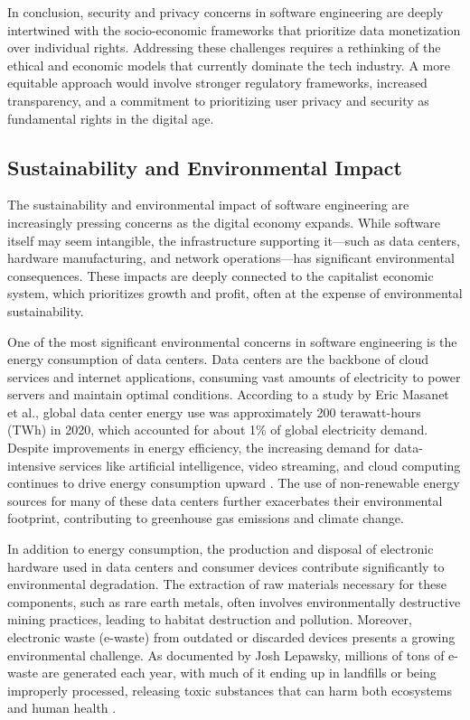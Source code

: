 \begin{refsection}
In conclusion, security and privacy concerns in software engineering are deeply intertwined with the socio-economic frameworks that prioritize data monetization over individual rights. Addressing these challenges requires a rethinking of the ethical and economic models that currently dominate the tech industry. A more equitable approach would involve stronger regulatory frameworks, increased transparency, and a commitment to prioritizing user privacy and security as fundamental rights in the digital age.

\subsection{Sustainability and Environmental Impact}

The sustainability and environmental impact of software engineering are increasingly pressing concerns as the digital economy expands. While software itself may seem intangible, the infrastructure supporting it—such as data centers, hardware manufacturing, and network operations—has significant environmental consequences. These impacts are deeply connected to the capitalist economic system, which prioritizes growth and profit, often at the expense of environmental sustainability.

One of the most significant environmental concerns in software engineering is the energy consumption of data centers. Data centers are the backbone of cloud services and internet applications, consuming vast amounts of electricity to power servers and maintain optimal conditions. According to a study by Eric Masanet et al., global data center energy use was approximately 200 terawatt-hours (TWh) in 2020, which accounted for about 1\% of global electricity demand. Despite improvements in energy efficiency, the increasing demand for data-intensive services like artificial intelligence, video streaming, and cloud computing continues to drive energy consumption upward \cite[pp.~984-986]{masanet2020recalibrating}. The use of non-renewable energy sources for many of these data centers further exacerbates their environmental footprint, contributing to greenhouse gas emissions and climate change.

In addition to energy consumption, the production and disposal of electronic hardware used in data centers and consumer devices contribute significantly to environmental degradation. The extraction of raw materials necessary for these components, such as rare earth metals, often involves environmentally destructive mining practices, leading to habitat destruction and pollution. Moreover, electronic waste (e-waste) from outdated or discarded devices presents a growing environmental challenge. As documented by Josh Lepawsky, millions of tons of e-waste are generated each year, with much of it ending up in landfills or being improperly processed, releasing toxic substances that can harm both ecosystems and human health \cite[pp.~50-53]{lepawsky2018reassembling}.


\end{refsection}
